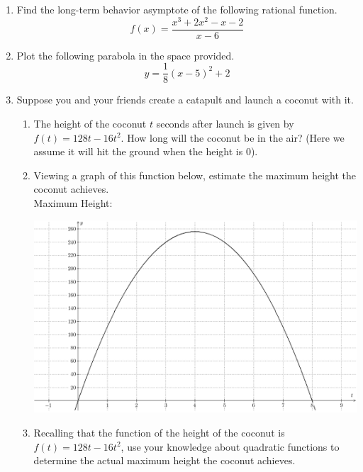 \documentclass{article}
\begin{document}
\begin{enumerate}
\begin{center}
\CartesianPlane[axes=yes,h=10,w=10]
\end{center} \vspace{1cm}

\newpage

\item Find the long-term behavior asymptote of the following rational function. \[ f(x) = \frac{x^3 + 2x^2 - x - 2}{x - 6} \] \vspace{6cm}

\item Plot the following parabola in the space provided. \[ y = \frac{1}{8} \left(x - 5\right)^2 +2 \]

\begin{center}
\CartesianPlane[axes=yes,h=10,w=10]
\end{center} \vspace{1cm}

\newpage

\item Suppose you and your friends create a catapult and launch a coconut with it.
\begin{enumerate}
\item The height of the coconut $t$ seconds after launch is given by $f(t)=128t-16t^2$. How long will the coconut be in the air? (Here we assume it will hit the ground when the height is $0$).
\vspace{1in}
\item Viewing a graph of this function below, estimate the maximum height the coconut achieves. \vspace{.25in}\\ 
Maximum Height: \\ \vspace{.25in}
\begin{center}
\includegraphics[scale=.5]{ca/tex/coconut.png}
\end{center}
\item Recalling that the function of the height of the coconut is $f(t)=128t-16t^2$, use your knowledge about quadratic functions to determine the actual maximum height the coconut achieves.
\end{enumerate}
\end{enumerate}
\end{document}
